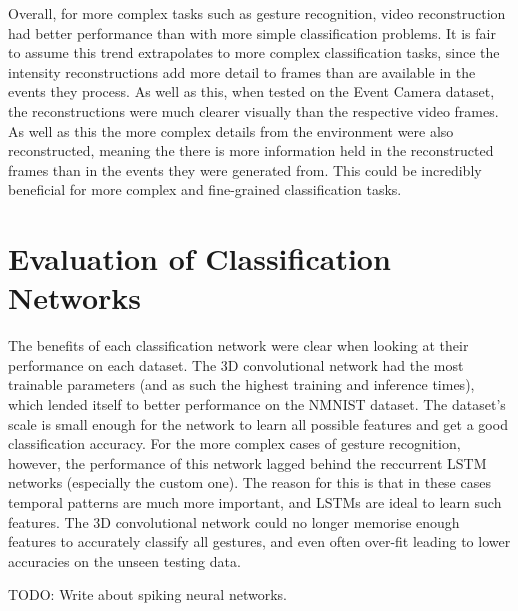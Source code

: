 Overall, for more complex tasks such as gesture recognition, video reconstruction had better performance than with more simple classification problems. It is fair to assume this trend extrapolates to more complex classification tasks, since the intensity reconstructions add more detail to frames than are available in the events they process. As well as this, when tested on the Event Camera dataset, the reconstructions were much clearer visually than the respective video frames. As well as this the more complex details from the environment were also reconstructed, meaning the there is more information held in the reconstructed frames than in the events they were generated from. This could be incredibly beneficial for more complex and fine-grained classification tasks.

\section{Evaluation of Classification Networks}

The benefits of each classification network were clear when looking at their performance on each dataset. The 3D convolutional network had the most trainable parameters (and as such the highest training and inference times), which lended itself to better performance on the NMNIST dataset. The dataset's scale is small enough for the network to learn all possible features and get a good classification accuracy. For the more complex cases of gesture recognition, however, the performance of this network lagged behind the reccurrent LSTM networks (especially the custom one). The reason for this is that in these cases temporal patterns are much more important, and LSTMs are ideal to learn such features. The 3D convolutional network could no longer memorise enough features to accurately classify all gestures, and even often over-fit leading to lower accuracies on the unseen testing data.

\color{red} TODO: Write about spiking neural networks. \color{black}



